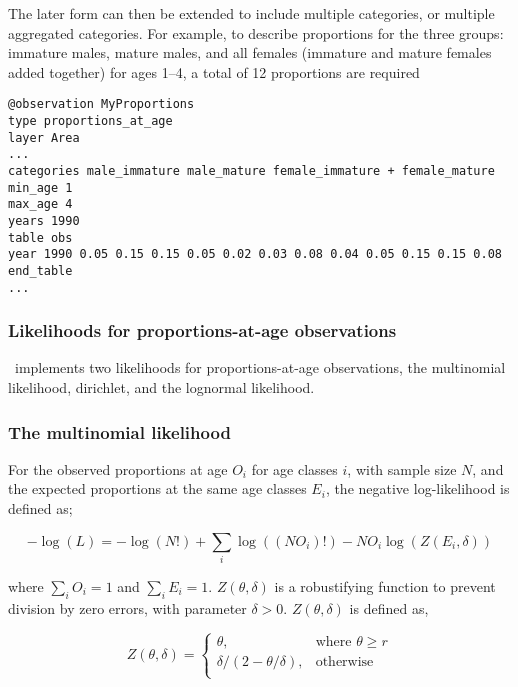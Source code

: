 {{{{The later form can then be extended to include multiple categories, or multiple aggregated categories. For example, to describe proportions for the three groups: immature males, mature males, and all females (immature and mature females added together) for ages 1--4, a total of 12 proportions are required 

{\small{\begin{verbatim}
@observation MyProportions
type proportions_at_age
layer Area
...
categories male_immature male_mature female_immature + female_mature
min_age 1
max_age 4
years 1990
table obs
year 1990 0.05 0.15 0.15 0.05 0.02 0.03 0.08 0.04 0.05 0.15 0.15 0.08
end_table
...
\end{verbatim}}}

\subsubsection{Likelihoods for proportions-at-age observations}

\CNAME\ implements two likelihoods for proportions-at-age observations, the multinomial likelihood, dirichlet, and the lognormal likelihood. 

\subsubsection*{The multinomial likelihood}

For the observed proportions at age $O_i$ for age classes $i$, with sample size $N$, and the expected proportions at the same age classes $E_i$, the negative log-likelihood is defined as; 

\begin{equation}
  -\log \left(L \right) =  -\log \left(N! \right) + \sum\limits_i \log \left( \left(NO_i \right)! \right) - NO_i \log \left(Z \left(E_i,\delta \right) \right)
\end{equation}

where $\sum\limits_i O_i = 1$ and $\sum\limits_i E_i = 1$. $Z \left(\theta,\delta \right)$ is a robustifying function to prevent division by zero errors, with parameter $\delta>0$. $Z \left(\theta,\delta \right)$ is defined as,

\begin{equation}
   Z \left(\theta,\delta \right) = \begin{cases}
	  \theta, & \text{where $\theta \ge r$} \\
	  \delta/\left( 2-\theta/\delta \right), & \text{otherwise} \\  
  \end{cases}
\end{equation}

}}}}
